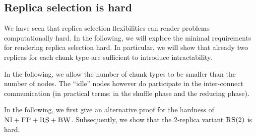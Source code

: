 \documentclass[9pt]{sigcomm-alternate}
\newcommand{\maciek}[1]{\textcolor{brown}{maciek: #1}}
\newcommand{\CC}{\textsc{NI}}
\newcommand{\FP}{\textsc{FP}}
\newcommand{\RS}{\textsc{RS}}
\newcommand{\BW}{\textsc{BW}}
\newcommand{\MA}{\textsc{MA}}
\begin{document}
\begin{appendix}
\section{Replica selection is hard}\label{ap:tworep}

We have seen that replica selection flexibilities can render problems computationally hard.
In the following, we will explore the minimal requirements for rendering replica selection hard.
In particular, we will show that already two replicas for each chunk type are sufficient to
introduce intractability.

In the following, we allow the number of chunk types to be smaller than the number of nodes.
 The ``idle'' nodes however do participate in the inter-connect communication (in practical terms: in the shuffle phase
 and the reducing phase).



In the following, we first give an alternative proof for the hardness of $\CC+\FP+\RS+\BW$.
Subsequently, we show that the 2-replica variant $\RS(2)$ is hard.




\end{appendix}
\end{document}
